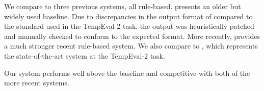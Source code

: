 We compare to three previous systems, all rule-based.
\needcite presents an older but widely
	used baseline.
Due to discrepancies in the output format of  compared to the 
	standard used in the TempEval-2 task, the output was heuristically patched
	and manually checked to conform to the expected format.
More recently, \needcite provides a much stronger recent rule-based
	system.
We also compare to \needcite, which represents the 
	state-of-the-art system at the TempEval-2 task.

Our system performs well above the  baseline and competitive
	with both of the more recent systems.



